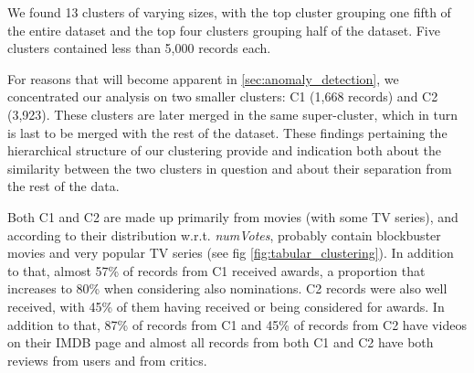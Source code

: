 We found 13 clusters of varying sizes, with the top cluster grouping one fifth of the entire dataset and the top four clusters grouping half of the dataset. Five clusters contained less than 5,000 records each.

For reasons that will become apparent in \ref{sec:anomaly_detection}, we concentrated our analysis on two smaller clusters: C1 (1,668 records) and C2 (3,923).
These clusters are later merged in the same super-cluster, which in turn is last to be merged with the rest of the dataset.
These findings pertaining the hierarchical structure of our clustering provide and indication both about the similarity between the two clusters in question and about their separation from the rest of the data.

Both C1 and C2 are made up primarily from movies (with some TV series), and according to their distribution w.r.t. \emph{numVotes}, probably contain blockbuster movies and very popular TV series (see fig \ref{fig:tabular_clustering}).
In addition to that, almost 57\% of records from C1 received awards, a proportion that increases to 80\% when considering also nominations.
C2 records were also well received, with 45\% of them having received or being considered for awards.
In addition to that, 87\% of records from C1 and 45\% of records from C2 have videos on their IMDB page and almost all records from both C1 and C2 have both reviews from users and from critics.